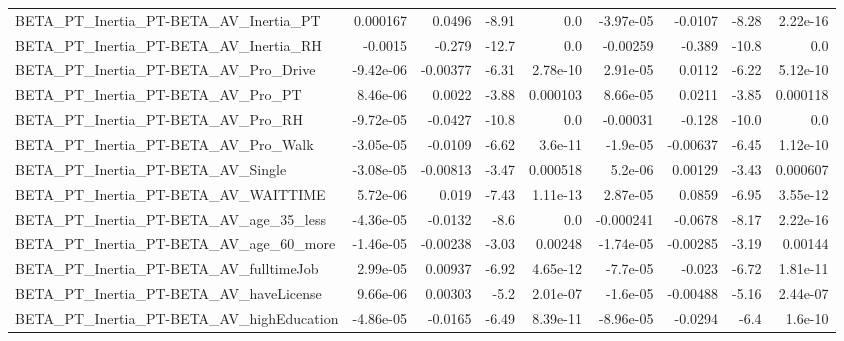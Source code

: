 \begin{tabular}{lrrrrrrrr}
BETA\_PT\_Inertia\_PT-BETA\_AV\_Inertia\_PT              &    0.000167 &       0.0496 &    -8.91 &      0.0 &  -3.97e-05 &     -0.0107 &        -8.28 &      2.22e-16 \\
BETA\_PT\_Inertia\_PT-BETA\_AV\_Inertia\_RH              &     -0.0015 &       -0.279 &    -12.7 &      0.0 &   -0.00259 &      -0.389 &        -10.8 &           0.0 \\
BETA\_PT\_Inertia\_PT-BETA\_AV\_Pro\_Drive               &   -9.42e-06 &     -0.00377 &    -6.31 & 2.78e-10 &   2.91e-05 &      0.0112 &        -6.22 &      5.12e-10 \\
BETA\_PT\_Inertia\_PT-BETA\_AV\_Pro\_PT                  &    8.46e-06 &       0.0022 &    -3.88 & 0.000103 &   8.66e-05 &      0.0211 &        -3.85 &      0.000118 \\
BETA\_PT\_Inertia\_PT-BETA\_AV\_Pro\_RH                  &   -9.72e-05 &      -0.0427 &    -10.8 &      0.0 &   -0.00031 &      -0.128 &        -10.0 &           0.0 \\
BETA\_PT\_Inertia\_PT-BETA\_AV\_Pro\_Walk                &   -3.05e-05 &      -0.0109 &    -6.62 &  3.6e-11 &   -1.9e-05 &    -0.00637 &        -6.45 &      1.12e-10 \\
BETA\_PT\_Inertia\_PT-BETA\_AV\_Single                  &   -3.08e-05 &     -0.00813 &    -3.47 & 0.000518 &    5.2e-06 &     0.00129 &        -3.43 &      0.000607 \\
BETA\_PT\_Inertia\_PT-BETA\_AV\_WAITTIME                &    5.72e-06 &        0.019 &    -7.43 & 1.11e-13 &   2.87e-05 &      0.0859 &        -6.95 &      3.55e-12 \\
BETA\_PT\_Inertia\_PT-BETA\_AV\_age\_35\_less             &   -4.36e-05 &      -0.0132 &     -8.6 &      0.0 &  -0.000241 &     -0.0678 &        -8.17 &      2.22e-16 \\
BETA\_PT\_Inertia\_PT-BETA\_AV\_age\_60\_more             &   -1.46e-05 &     -0.00238 &    -3.03 &  0.00248 &  -1.74e-05 &    -0.00285 &        -3.19 &       0.00144 \\
BETA\_PT\_Inertia\_PT-BETA\_AV\_fulltimeJob             &    2.99e-05 &      0.00937 &    -6.92 & 4.65e-12 &   -7.7e-05 &      -0.023 &        -6.72 &      1.81e-11 \\
BETA\_PT\_Inertia\_PT-BETA\_AV\_haveLicense             &    9.66e-06 &      0.00303 &     -5.2 & 2.01e-07 &   -1.6e-05 &    -0.00488 &        -5.16 &      2.44e-07 \\
BETA\_PT\_Inertia\_PT-BETA\_AV\_highEducation           &   -4.86e-05 &      -0.0165 &    -6.49 & 8.39e-11 &  -8.96e-05 &     -0.0294 &         -6.4 &       1.6e-10 \\

\end{tabular}
